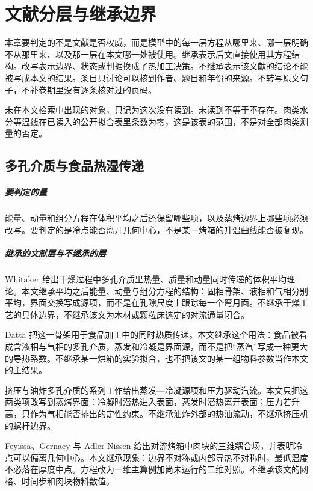 \chapter{文献分层与继承边界}
\label{ch:lit}

本章要判定的不是文献是否权威，而是模型中的每一层方程从哪里来、哪一层明确不从那里来、以及那一层在本文哪一处被使用。继承表示后文直接使用其方程结构。改写表示边界、状态或判据换成了热加工决策。不继承表示该文献的结论不能被写成本文的结果。条目只讨论可以核到作者、题目和年份的来源。不转写原文句子，不补卷期里没有逐条核对过的页码。

未在本文检索中出现的对象，只记为这次没有读到。未读到不等于不存在。肉类水分等温线在已读入的公开拟合表里条数为零，这是该表的范围，不是对全部肉类测量的否定。

\section{多孔介质与食品热湿传递}

\paragraph{要判定的量}
能量、动量和组分方程在体积平均之后还保留哪些项，以及蒸烤边界上哪些项必须改写。要判定的是冷点能否离开几何中心，不是某一烤箱的升温曲线能否被复现。

\paragraph{继承的文献层与不继承的层}
Whitaker 给出干燥过程中多孔介质里热量、质量和动量同时传递的体积平均理论\cite{whitaker1977}。本文继承平均之后能量、动量与组分方程的结构：固相骨架、液相和气相分别平均，界面交换写成源项，而不是在孔隙尺度上跟踪每一个弯月面。不继承干燥工艺的具体边界，不继承该文为木材或颗粒床选定的对流通量闭合。

Datta 把这一骨架用于食品加工中的同时热质传递\cite{datta2007}。本文继承这个用法：食品被看成含液相与气相的多孔介质，蒸发和冷凝是界面源，而不是把“蒸汽”写成一种更大的导热系数。不继承某一烘箱的实验拟合，也不把该文的某一组物料参数当作本文的主结果。

挤压与油炸多孔介质的系列工作给出蒸发—冷凝源项和压力驱动汽流。本文只把这两类项改写到蒸烤界面：冷凝时潜热进入表面，蒸发时潜热离开表面；压力若升高，只作为气相能否排出的定性约束。不继承油炸外部的热油流动，不继承挤压机的螺杆边界。

Feyissa、Gernaey 与 Adler-Nissen 给出对流烤箱中肉块的三维耦合场，并表明冷点可以偏离几何中心\cite{feyissa2013}。本文继承现象：边界不对称或内部导热不对称时，最低温度不必落在厚度中点。方程改为一维主算例加尚未运行的二维对照。不继承该文的网格、时间步和肉块物料数值。

